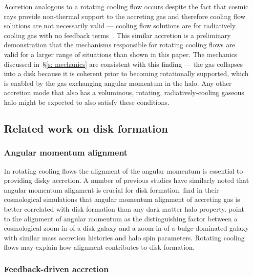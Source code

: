 \documentclass[fleqn,usenatbib]{mnras}
\begin{document}
Accretion analogous to a rotating cooling flow occurs despite the fact that cosmic rays provide non-thermal support to the accreting gas and therefore cooling flow solutions are not necessarily valid --- cooling flow solutions are for radiatively cooling gas with no feedback terms~\citep[e.g.][]{Stern2019}.
This similar accretion is a preliminary demonstration that the mechanisms responsible for rotating cooling flows are valid for a larger range of situations than shown in this paper.
The mechanics discussed in~\S\ref{s: mechanics} are consistent with this finding ---
the gas collapses into a disk because it is coherent prior to becoming rotationally supported, which is enabled by the gas exchanging angular momentum in the halo.
Any other accretion mode that also has a voluminous, rotating, radiatively-cooling gaseous halo might be expected to also satisfy these conditions.

\subsection{Related work on disk formation}
\label{s: other disk formation}

\subsubsection{Angular momentum alignment}
\label{s: other disk formation -- alignment}

In rotating cooling flows the alignment of the angular momentum is essential to providing disky accretion.
A number of previous studies have similarly noted that angular momentum alignment is crucial for disk formation.
\cite{Sales2012} find in their cosmological simulations that angular momentum alignment of accreting gas is better correlated with disk formation than any dark matter halo property.
\cite{Kretschmer2020} point to the alignment of angular momentum as the distinguishing factor between a cosmological zoom-in of a disk galaxy and a zoom-in of a bulge-dominated galaxy with similar mass accretion histories and halo spin parameters.
Rotating cooling flows may explain how alignment contributes to disk formation.

\subsubsection{Feedback-driven accretion}
\label{s: other disk formation -- feedback-driven}
\end{document}
